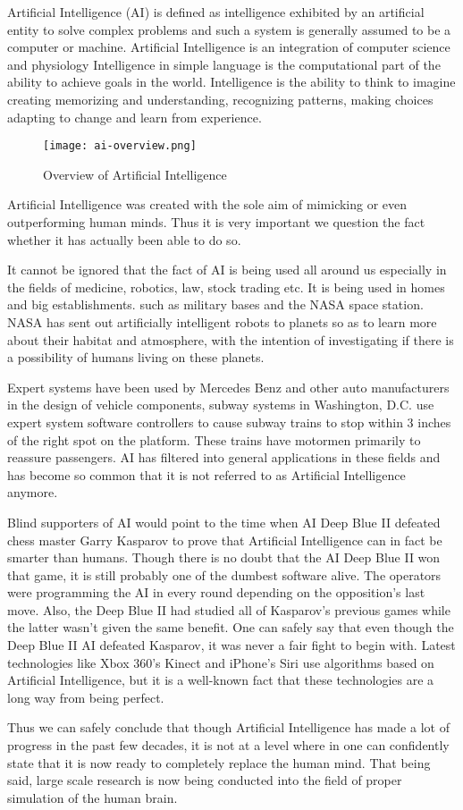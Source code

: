 Artificial Intelligence (AI) is defined as intelligence exhibited by an artificial entity to solve complex problems and such a system is generally assumed to be a computer or machine. Artificial Intelligence is an integration of computer science and physiology Intelligence in simple language is the computational part of the ability to achieve goals in the world. Intelligence is the ability to think to imagine creating memorizing and understanding, recognizing patterns, making choices adapting to change and learn from experience.

\begin{figure}[H]
    \centering
    \texttt{[image: ai-overview.png]}
    \caption{Overview of Artificial Intelligence}
    \label{fig:ai-overview}
\end{figure}

Artificial Intelligence was created with the sole aim of mimicking or even outperforming human minds. Thus it is very important we question the fact whether it has actually been able to do so.

It cannot be ignored that the fact of AI is being used all around us especially in the fields of medicine, robotics, law, stock trading etc. It is being used in homes and big establishments. such as military bases and the NASA space station. NASA has sent out artificially intelligent robots to planets so as to learn more about their habitat and atmosphere, with the intention of investigating if there is a possibility of humans living on these planets.

Expert systems have been used by Mercedes Benz and other auto manufacturers in the design of vehicle components, subway systems in Washington, D.C. use expert system software controllers to cause subway trains to stop within 3 inches of the right spot on the platform. These trains have motormen primarily to reassure passengers. AI has filtered into general applications in these fields and has become so common that it is not referred to as Artificial Intelligence anymore.

Blind supporters of AI would point to the time when AI Deep Blue II defeated chess master Garry Kasparov to prove that Artificial Intelligence can in fact be smarter than humans. Though there is no doubt that the AI Deep Blue II won that game, it is still probably one of the dumbest software alive. The operators were programming the AI in every round depending on the opposition’s last move. Also, the Deep Blue II had studied all of Kasparov’s previous games while the latter wasn’t given the same benefit. One can safely say that even though the Deep Blue II AI defeated Kasparov, it was never a fair fight to begin with. Latest technologies like Xbox 360’s Kinect and iPhone’s Siri use algorithms based on Artificial Intelligence, but it is a well-known fact that these technologies are a long way from being perfect.

Thus we can safely conclude that though Artificial Intelligence has made a lot of progress in the past few decades, it is not at a level where in one can confidently state that it is now ready to completely replace the human mind. That being said, large scale research is now being conducted into the field of proper simulation of the human brain.
